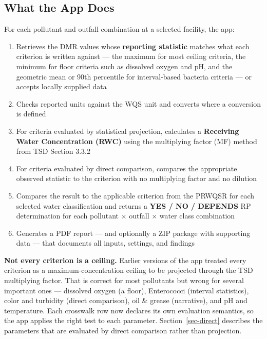 \documentclass[
  11pt,
  letterpaper,
  DIV=11,
  numbers=noendperiod]{scrartcl}
\providecommand{\tightlist}{%
  \setlength{\itemsep}{0pt}\setlength{\parskip}{0pt}}
\begin{document}
\subsection{What the App Does}\label{sec-what-it-does}

For each pollutant and outfall combination at a selected facility, the
app:

\begin{enumerate}
\def\labelenumi{\arabic{enumi}.}
\tightlist
\item
  Retrieves the DMR values whose \textbf{reporting statistic} matches
  what each criterion is written against --- the maximum for most
  ceiling criteria, the minimum for floor criteria such as dissolved
  oxygen and pH, and the geometric mean or 90th percentile for
  interval-based bacteria criteria --- or accepts locally supplied data
\item
  Checks reported units against the WQS unit and converts where a
  conversion is defined
\item
  For criteria evaluated by statistical projection, calculates a
  \textbf{Receiving Water Concentration (RWC)} using the multiplying
  factor (MF) method from TSD Section 3.3.2
\item
  For criteria evaluated by direct comparison, compares the appropriate
  observed statistic to the criterion with no multiplying factor and no
  dilution
\item
  Compares the result to the applicable criterion from the PRWQSR for
  each selected water classification and returns a \textbf{YES / NO /
  DEPENDS} RP determination for each pollutant × outfall × water class
  combination
\item
  Generates a PDF report --- and optionally a ZIP package with
  supporting data --- that documents all inputs, settings, and findings
\end{enumerate}

\begin{tcolorbox}[enhanced jigsaw, arc=.35mm, bottomrule=.15mm, bottomtitle=1mm, breakable, colback=white, colbacktitle=quarto-callout-note-color!10!white, colframe=quarto-callout-note-color-frame, coltitle=black, left=2mm, leftrule=.75mm, opacityback=0, opacitybacktitle=0.6, rightrule=.15mm, title=\textcolor{quarto-callout-note-color}{\faInfo}\hspace{0.5em}{Note}, titlerule=0mm, toprule=.15mm, toptitle=1mm]

\textbf{Not every criterion is a ceiling.} Earlier versions of the app
treated every criterion as a maximum-concentration ceiling to be
projected through the TSD multiplying factor. That is correct for most
pollutants but wrong for several important ones --- dissolved oxygen (a
floor), Enterococci (interval statistics), color and turbidity (direct
comparison), oil \& grease (narrative), and pH and temperature. Each
crosswalk row now declares its own evaluation semantics, so the app
applies the right test to each parameter. Section~\ref{sec-direct}
describes the parameters that are evaluated by direct comparison rather
than projection.

\end{tcolorbox}
\end{document}
